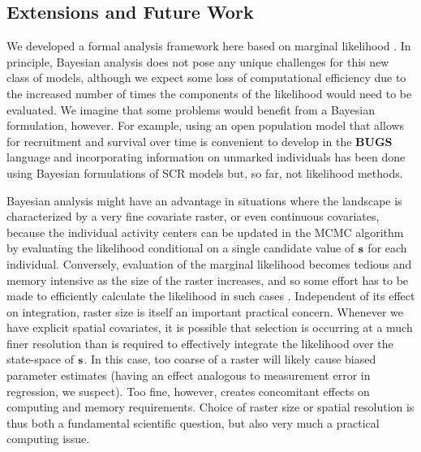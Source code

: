 \documentclass[12pt]{article}
\begin{document}
\subsection{Extensions and Future Work}


We developed a formal analysis framework here based on marginal
likelihood \citep{borchers_efford:2008}.  In principle, Bayesian
analysis does not pose any unique challenges for this new class of
models, although we expect some loss of computational efficiency due to
the increased number of times the components of the likelihood would
need to be evaluated.  We imagine that some problems would benefit
from a Bayesian formulation, however. For example, using an open
population model that allows for recruitment and survival over time
\citep{gardner_etal:2010ecol} is convenient to develop in the {\bf
  BUGS} language and incorporating information on unmarked individuals
has been done using Bayesian formulations of SCR models
\citep{chandler_royle:2012, sollmann_etal:inprepjapplecol} but, so far, not
likelihood methods.

Bayesian analysis might have an advantage in situations where the
landscape is characterized by a very fine covariate raster, or even
continuous covariates, because the individual activity centers can be
updated in the MCMC algorithm by evaluating the likelihood conditional
on a single candidate value of ${\bf s}$ for each individual.
Conversely, evaluation of the marginal likelihood becomes tedious and
memory intensive as the size of the raster increases, and so some
effort has to be made to efficiently calculate the likelihood in such
cases \citep[e.g., see][]{warton_shepherd:2010}. Independent of its
effect on integration, raster size is itself an important practical
concern.
Whenever we have explicit spatial covariates, it is possible that
selection is occurring at a much finer resolution than is required to
effectively integrate the likelihood over the state-space of ${\bf
  s}$. In this case, too coarse of a raster will likely cause biased
parameter estimates (having an effect analogous to measurement error
in regression, we suspect). Too fine, however, creates concomitant
effects on computing and memory requirements.  Choice of raster size
or spatial resolution is thus both a fundamental scientific question,
but also very much a practical computing issue.
\end{document}
